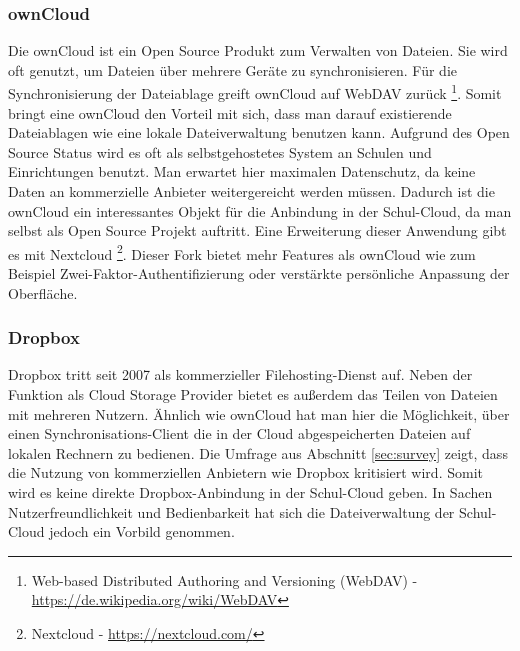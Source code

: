 \subsubsection{ownCloud}

Die ownCloud ist ein Open Source Produkt zum Verwalten von Dateien. Sie wird oft genutzt, um Dateien über mehrere Geräte zu synchronisieren. Für die Synchronisierung der Dateiablage greift ownCloud auf WebDAV zurück \footnote{Web-based Distributed Authoring and Versioning (WebDAV) - \url{https://de.wikipedia.org/wiki/WebDAV}}. Somit bringt eine ownCloud den Vorteil mit sich, dass man darauf existierende Dateiablagen wie eine lokale Dateiverwaltung benutzen kann. Aufgrund des Open Source Status wird es oft als selbstgehostetes System an Schulen und Einrichtungen benutzt. Man erwartet hier maximalen Datenschutz, da keine Daten an kommerzielle Anbieter weitergereicht werden müssen. Dadurch ist die ownCloud ein interessantes Objekt für die Anbindung in der Schul-Cloud, da man selbst als Open Source Projekt auftritt. Eine Erweiterung dieser Anwendung gibt es mit Nextcloud \footnote{Nextcloud - \url{https://nextcloud.com/}}. Dieser Fork bietet mehr Features als ownCloud wie zum Beispiel Zwei-Faktor-Authentifizierung oder verstärkte persönliche Anpassung der Oberfläche.

\subsubsection{Dropbox}

Dropbox tritt seit 2007 als kommerzieller Filehosting-Dienst auf. Neben der Funktion als Cloud Storage Provider bietet es außerdem das Teilen von Dateien mit mehreren Nutzern. Ähnlich wie ownCloud hat man hier die Möglichkeit, über einen Synchronisations-Client die in der Cloud abgespeicherten Dateien auf lokalen Rechnern zu bedienen. Die Umfrage aus Abschnitt \ref{sec:survey} zeigt, dass die Nutzung von kommerziellen Anbietern wie Dropbox kritisiert wird. Somit wird es keine direkte Dropbox-Anbindung in der Schul-Cloud geben. In Sachen Nutzerfreundlichkeit und Bedienbarkeit hat sich die Dateiverwaltung der Schul-Cloud jedoch ein Vorbild genommen. 

\clearpage

